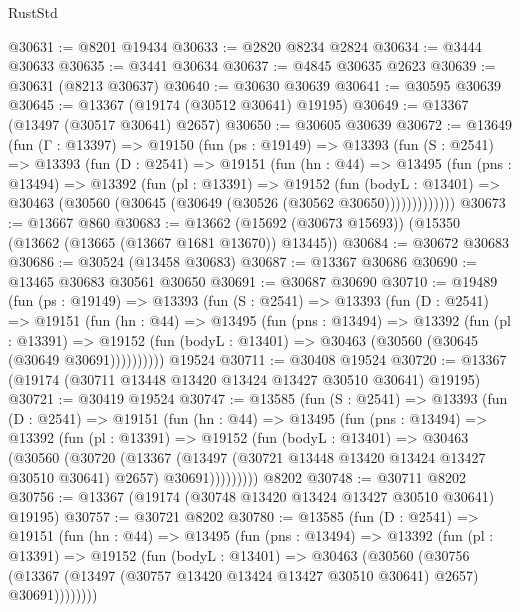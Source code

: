 \begin{lexlean}{RustStd}
\begin{coremodule}
@30631 := @8201 @19434
@30633 := @2820 @8234 @2824
@30634 := @3444 @30633
@30635 := @3441 @30634
@30637 := @4845 @30635 @2623
@30639 := @30631 (@8213 @30637)
@30640 := @30630 @30639
@30641 := @30595 @30639
@30645 := @13367 (@19174 (@30512 @30641) @19195)
@30649 := @13367 (@13497 (@30517 @30641) @2657)
@30650 := @30605 @30639
@30672 := @13649
    (fun (Γ : @13397) =>
    @19150
      (fun (ps : @19149) =>
      @13393
        (fun (S : @2541) =>
        @13393
          (fun (D : @2541) =>
          @19151
            (fun (hn : @44) =>
            @13495
              (fun (pns : @13494) =>
              @13392
                (fun (pl : @13391) =>
                @19152
                  (fun (bodyL : @13401) =>
                  @30463 (@30560 (@30645 (@30649 (@30526 (@30562 @30650)))))))))))))
@30673 := @13667 @860
@30683 := @13662 (@15692 (@30673 @15693)) (@15350 (@13662 (@13665 (@13667 @1681 @13670)) @13445))
@30684 := @30672 @30683
@30686 := @30524 (@13458 @30683)
@30687 := @13367 @30686
@30690 := @13465 @30683 @30561 @30650
@30691 := @30687 @30690
@30710 := @19489
    (fun (ps : @19149) =>
    @13393
      (fun (S : @2541) =>
      @13393
        (fun (D : @2541) =>
        @19151
          (fun (hn : @44) =>
          @13495
            (fun (pns : @13494) =>
            @13392
              (fun (pl : @13391) =>
              @19152 (fun (bodyL : @13401) => @30463 (@30560 (@30645 (@30649 @30691))))))))))
    @19524
@30711 := @30408 @19524
@30720 := @13367 (@19174 (@30711 @13448 @13420 @13424 @13427 @30510 @30641) @19195)
@30721 := @30419 @19524
@30747 := @13585
    (fun (S : @2541) =>
    @13393
      (fun (D : @2541) =>
      @19151
        (fun (hn : @44) =>
        @13495
          (fun (pns : @13494) =>
          @13392
            (fun (pl : @13391) =>
            @19152
              (fun (bodyL : @13401) =>
              @30463
                (@30560
                  (@30720
                    (@13367
                      (@13497 (@30721 @13448 @13420 @13424 @13427 @30510 @30641) @2657)
                      @30691)))))))))
    @8202
@30748 := @30711 @8202
@30756 := @13367 (@19174 (@30748 @13420 @13424 @13427 @30510 @30641) @19195)
@30757 := @30721 @8202
@30780 := @13585
    (fun (D : @2541) =>
    @19151
      (fun (hn : @44) =>
      @13495
        (fun (pns : @13494) =>
        @13392
          (fun (pl : @13391) =>
          @19152
            (fun (bodyL : @13401) =>
            @30463
              (@30560
                (@30756
                  (@13367 (@13497 (@30757 @13420 @13424 @13427 @30510 @30641) @2657) @30691))))))))

\end{coremodule}
\end{lexlean}
